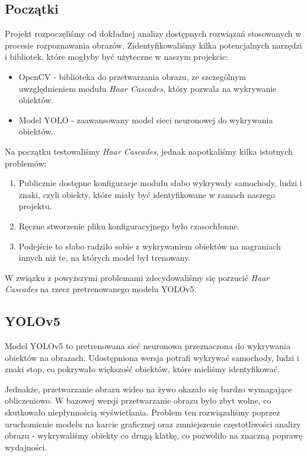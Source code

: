 \subsection*{Początki}

Projekt rozpoczęliśmy od dokładnej analizy dostępnych rozwiązań stosowanych w procesie rozpoznawania obrazów. Zidentyfikowaliśmy kilka potencjalnych narzędzi i bibliotek, które mogłyby być użyteczne w naszym projekcie:
\begin{itemize}
    \item OpenCV - biblioteka do przetwarzania obrazu, ze szczególnym uwzględnieniem modułu \textit{Haar Cascades}, który pozwala na wykrywanie obiektów.
    \item Model YOLO - zaawansowany model sieci neuronowej do wykrywania obiektów.
\end{itemize}

Na początku testowaliśmy \textit{Haar Cascades}, jednak napotkaliśmy kilka istotnych problemów:
\begin{enumerate}
    \item Publicznie dostępne konfiguracje modułu słabo wykrywały samochody, ludzi i znaki, czyli obiekty, które miały być identyfikowane w ramach naszego projektu.
    \item Ręczne stworzenie pliku konfiguracyjnego było czasochłonne.
    \item Podejście to słabo radziło sobie z wykrywaniem obiektów na nagraniach innych niż te, na których model był trenowany.
\end{enumerate}

W związku z powyższymi problemami zdecydowaliśmy się porzucić \textit{Haar Cascades} na rzecz pretrenowanego
modelu YOLOv5.

\subsection*{YOLOv5}

Model YOLOv5 \cite[zobacz:][]{YOLOv5} to pretrenowana sieć neuronowa przeznaczona do wykrywania obiektów na obrazach. Udostępniona wersja potrafi wykrywać samochody, ludzi i znaki stop, co pokrywało większość obiektów, które mieliśmy identyfikować.

Jednakże, przetwarzanie obrazu wideo na żywo okazało się bardzo wymagające obliczeniowo. W bazowej wersji przetwarzanie obrazu było zbyt wolne, co skutkowało niepłynnością wyświetlania. Problem ten rozwiązaliśmy poprzez uruchomienie modelu na karcie graficznej oraz zmniejszenie częstotliwości analizy obrazu - wykrywaliśmy obiekty co drugą klatkę, co pozwoliło na znaczną poprawę wydajności.

